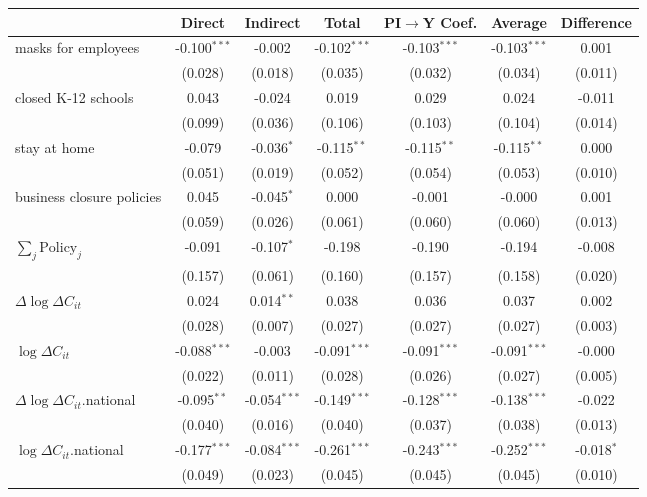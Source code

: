 
\begin{tabular}{lccccc|>{}c}
\toprule
  & Direct & Indirect & Total & PI$\to$Y Coef. & Average & Difference\\
\midrule
masks for employees & -0.100$^{***}$ & -0.002 & -0.102$^{***}$ & -0.103$^{***}$ & -0.103$^{***}$ & 0.001\\
 & (0.028) & (0.018) & (0.035) & (0.032) & (0.034) & (0.011)\\
closed K-12 schools & 0.043 & -0.024 & 0.019 & 0.029 & 0.024 & -0.011\\
 & (0.099) & (0.036) & (0.106) & (0.103) & (0.104) & (0.014)\\
stay at home & -0.079 & -0.036$^{*}$ & -0.115$^{**}$ & -0.115$^{**}$ & -0.115$^{**}$ & 0.000\\
 & (0.051) & (0.019) & (0.052) & (0.054) & (0.053) & (0.010)\\
business closure policies & 0.045 & -0.045$^{*}$ & 0.000 & -0.001 & -0.000 & 0.001\\
 & (0.059) & (0.026) & (0.061) & (0.060) & (0.060) & (0.013)\\
$\sum_j \mathrm{Policy}_j$ & -0.091 & -0.107$^{*}$ & -0.198 & -0.190 & -0.194 & -0.008\\
 & (0.157) & (0.061) & (0.160) & (0.157) & (0.158) & (0.020)\\
$\Delta \log \Delta C_{it}$ & 0.024 & 0.014$^{**}$ & 0.038 & 0.036 & 0.037 & 0.002\\
 & (0.028) & (0.007) & (0.027) & (0.027) & (0.027) & (0.003)\\
$\log \Delta C_{it}$ & -0.088$^{***}$ & -0.003 & -0.091$^{***}$ & -0.091$^{***}$ & -0.091$^{***}$ & -0.000\\
 & (0.022) & (0.011) & (0.028) & (0.026) & (0.027) & (0.005)\\
$\Delta \log \Delta C_{it}$.national & -0.095$^{**}$ & -0.054$^{***}$ & -0.149$^{***}$ & -0.128$^{***}$ & -0.138$^{***}$ & -0.022\\
 & (0.040) & (0.016) & (0.040) & (0.037) & (0.038) & (0.013)\\
$\log \Delta C_{it}$.national & -0.177$^{***}$ & -0.084$^{***}$ & -0.261$^{***}$ & -0.243$^{***}$ & -0.252$^{***}$ & -0.018$^{*}$\\
 & (0.049) & (0.023) & (0.045) & (0.045) & (0.045) & (0.010)\\
\bottomrule
\end{tabular}